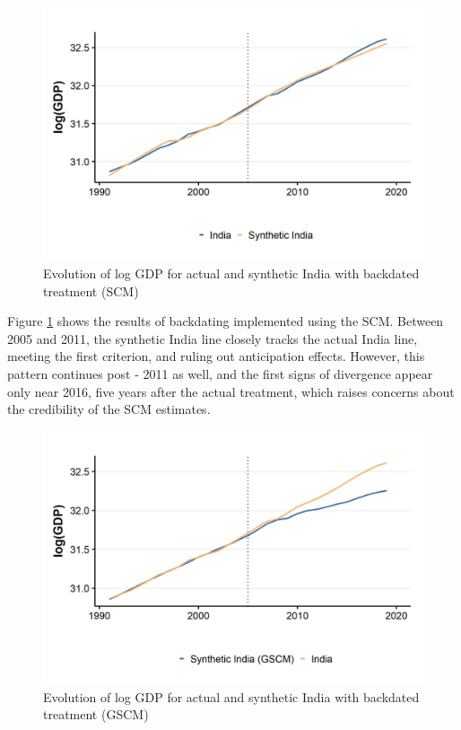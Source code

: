 \documentclass[12pt,nobind, a4paper]{reedthesis}
\begin{document}
 \newpage
 \begin{figure}

 {\centering \includegraphics[width=1\linewidth]{figure/indiasynthbd} 

 }

 \caption{Evolution of log GDP for actual and synthetic India with backdated treatment (SCM)}\label{fig:scmbd}
 \end{figure}
 Figure \ref{fig:scmbd} shows the results of backdating implemented using the SCM. Between 2005 and 2011, the synthetic India line closely tracks the actual India line, meeting the first criterion, and ruling out anticipation effects. However, this pattern continues post - 2011 as well, and the first signs of divergence appear only near 2016, five years after the actual treatment, which raises concerns about the credibility of the SCM estimates.
 \newpage
 \begin{figure}

 {\centering \includegraphics[width=1\linewidth]{figure/indiagsynthbd} 

 }

 \caption{Evolution of log GDP for actual and synthetic India with backdated treatment (GSCM)}\label{fig:gscmbd}
 \end{figure}
\end{document}
